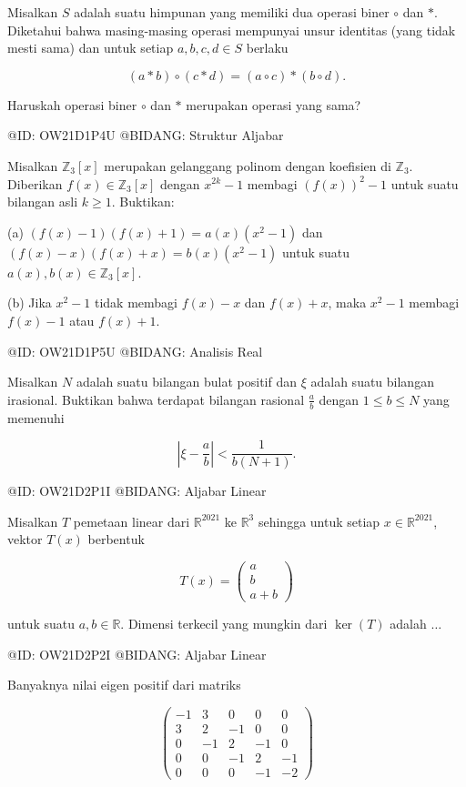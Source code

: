 Misalkan $S$ adalah suatu himpunan yang memiliki dua operasi biner $\circ$ dan $*$. Diketahui bahwa masing-masing operasi mempunyai unsur identitas (yang tidak mesti sama) dan untuk setiap $a,b,c,d\in S$ berlaku

$$
(a*b)\circ(c*d)=(a\circ c)*(b\circ d).
$$

Haruskah operasi biner $\circ$ dan $*$ merupakan operasi yang sama?

@ID: OW21D1P4U
@BIDANG: Struktur Aljabar

Misalkan $\mathbb Z_3[x]$ merupakan gelanggang polinom dengan koefisien di $\mathbb Z_3$. Diberikan $f(x)\in\mathbb Z_3[x]$ dengan $x^{2k}-1$ membagi $(f(x))^2-1$ untuk suatu bilangan asli $k\ge1$. Buktikan:

(a) $(f(x)-1)(f(x)+1)=a(x)(x^2-1)$ dan $(f(x)-x)(f(x)+x)=b(x)(x^2-1)$ untuk suatu $a(x),b(x)\in\mathbb Z_3[x]$.

(b) Jika $x^2-1$ tidak membagi $f(x)-x$ dan $f(x)+x$, maka $x^2-1$ membagi $f(x)-1$ atau $f(x)+1$.

@ID: OW21D1P5U
@BIDANG: Analisis Real

Misalkan $N$ adalah suatu bilangan bulat positif dan $\xi$ adalah suatu bilangan irasional. Buktikan bahwa terdapat bilangan rasional $\frac ab$ dengan $1\le b\le N$ yang memenuhi

$$
\left|\xi-\frac ab\right|
<
\frac1{b(N+1)}.
$$

@ID: OW21D2P1I
@BIDANG: Aljabar Linear

Misalkan $T$ pemetaan linear dari $\mathbb R^{2021}$ ke $\mathbb R^3$ sehingga untuk setiap $x\in\mathbb R^{2021}$, vektor $T(x)$ berbentuk

$$
T(x)=
\begin{pmatrix}
a\\
b\\
a+b
\end{pmatrix}
$$

untuk suatu $a,b\in\mathbb R$. Dimensi terkecil yang mungkin dari $\ker(T)$ adalah $\ldots$

@ID: OW21D2P2I
@BIDANG: Aljabar Linear

Banyaknya nilai eigen positif dari matriks

$$
\begin{pmatrix}
-1&3&0&0&0\\
3&2&-1&0&0\\
0&-1&2&-1&0\\
0&0&-1&2&-1\\
0&0&0&-1&-2
\end{pmatrix}
$$

